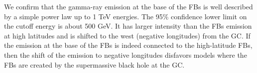 \documentclass[preprint]{aa}
\begin{document}
   {We confirm that the gamma-ray emission at the base of the FBs is well described by a simple power law up to 1 TeV energies.
   The 95\% confidence lower limit on the cutoff energy is about 500 GeV.
   It has larger intensity than the FBs emission at high latitudes and is shifted to the west (negative longitudes) from the GC.
   If the emission at the base of the FBs is indeed connected to the high-latitude FBs, 
   then the shift of the emission to negative longitudes disfavors models where the FBs are created by
   the supermassive black hole at the GC.
   }
   {}


\maketitle
   
   
\tableofcontents








\newpage
  

\begin{appendix}


%
\end{appendix}
\end{document}
